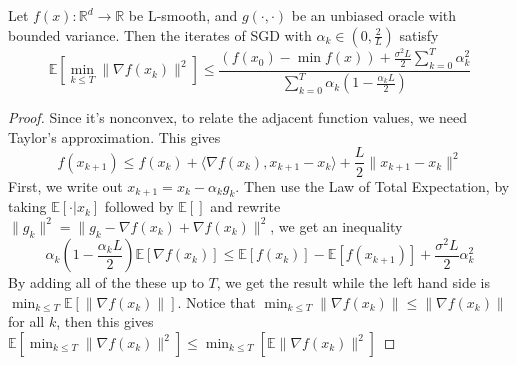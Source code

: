 \begin{theorem}
    Let $f(x) : \mathbb{R}^d \rightarrow \mathbb{R}$ be L-smooth, and $g(\cdot, \cdot)$ be an unbiased oracle with bounded variance. Then the iterates of SGD with $\alpha_k \in (0, \frac{2}{L})$ satisfy
    \begin{equation*}
        \mathbb{E}[\min_{k \leq T} \|\nabla f(x_k)\|^2] \leq \frac{(f(x_0) - \min f(x)) + \frac{\sigma^2L}{2}\sum_{k=0}^{T}\alpha_k^2}{\sum_{k=0}^{T}\alpha_k(1 - \frac{\alpha_k L }{2})}
    \end{equation*}
\end{theorem}
\begin{proof}
    Since it's nonconvex, to relate the adjacent function values, we need Taylor's approximation. This gives 
    \begin{equation*}
        f(x_{k+1}) \leq f(x_k) + \langle \nabla f(x_k), x_{k+1} - x_{k} \rangle + \frac{L}{2}\|x_{k+1} - x_k\|^2
    \end{equation*}
    First, we write out $x_{k+1} = x_k - \alpha_k g_k$. Then use the Law of Total Expectation, by taking $\mathbb{E}[\cdot | x_k]$ followed by $\mathbb{E}[]$ and rewrite $\|g_k\|^2 = \|g_k - \nabla f(x_k) + \nabla f(x_k)\|^2$, we get an inequality
    \begin{equation*}
        \alpha_k(1 - \frac{\alpha_kL}{2})\mathbb{E}[\nabla f(x_k)] \leq \mathbb{E}[f(x_{k})] - \mathbb{E}[f(x_{k+1})] + \frac{\sigma^2L}{2}\alpha_k^2
    \end{equation*}
    By adding all of the these up to $T$, we get the result while the left hand side is $\min_{k\leq T}\mathbb{E}[\|\nabla f(x_k)\|]$. Notice that $\min_{k \leq T}  \|\nabla f(x_k)\| \leq \|\nabla f(x_k)\|$ for all $k$, then this gives $\mathbb{E}[\min_{k \leq T} \|\nabla f(x_k)\|^2] \leq \min_{k \leq T}[\mathbb{E} \|\nabla f(x_k)\|^2]$
\end{proof}

